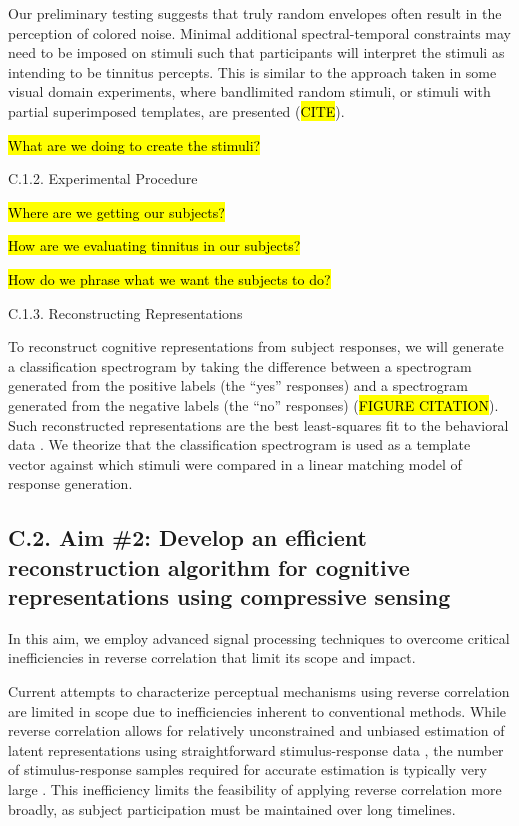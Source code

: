\documentclass[11pt, notitlepage]{article} %
\begin{document}
Our preliminary testing suggests that truly random envelopes
often result in the perception of colored noise.
Minimal additional spectral-temporal constraints may need to be imposed on stimuli
such that participants will interpret the stimuli as intending to be tinnitus percepts.
This is similar to the approach taken in some visual domain experiments,
where bandlimited random stimuli, or stimuli with partial superimposed templates,
are presented \cite{smithMeasuringInternalRepresentations2012} (\hl{CITE}).

\hl{What are we doing to create the stimuli?}

\begin{description}
	\item[C.1.2. Experimental Procedure] 
\end{description}

\hl{Where are we getting our subjects?}

\hl{How are we evaluating tinnitus in our subjects?}

\hl{How do we phrase what we want the subjects to do?}

\begin{description}
	\item[C.1.3. Reconstructing Representations] 
\end{description}

To reconstruct cognitive representations from subject responses,
we will generate a classification spectrogram by taking the difference
between a spectrogram generated from the positive labels (the ``yes'' responses)
and a spectrogram generated from the negative labels (the ``no'' responses)
(\hl{FIGURE CITATION}).
Such reconstructed representations are the best least-squares fit to the behavioral data
\cite{gosselinSuperstitiousPerceptionsReveal2003}.
We theorize that the classification spectrogram is used as a template vector
against which stimuli were compared in a linear matching model of response generation.

\subsection*{C.2. Aim \#2: Develop an efficient reconstruction algorithm for cognitive representations using compressive sensing}

In this aim, we employ advanced signal processing techniques to overcome critical inefficiencies
in reverse correlation that limit its scope and impact.

Current attempts to characterize perceptual mechanisms using reverse correlation
are limited in scope due to inefficiencies inherent to conventional methods.
While reverse correlation allows for relatively unconstrained and unbiased
estimation of latent representations using straightforward stimulus-response data
\cite{marmarelisWhiteNoiseMethodSystem1978,nishimotoReceptiveFieldProperties2006},
the number of stimulus-response samples required for accurate estimation
is typically very large \cite{mineaultImprovedClassificationImages2009}.
This inefficiency limits the feasibility of applying reverse correlation more broadly,
as subject participation must be maintained over long timelines.
\end{document}
